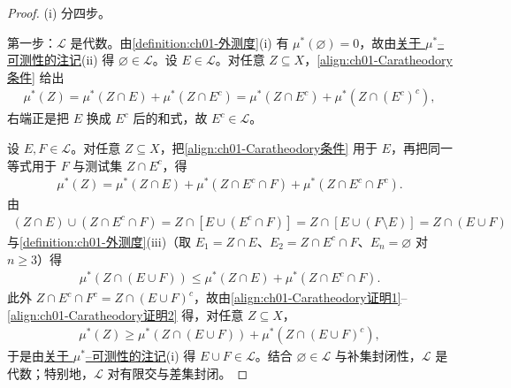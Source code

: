 \documentclass[../../main.tex]{subfiles}%
\begin{document}
\begin{proof}
(i) 分四步。

第一步：$\mathcal{L}$ 是代数。由\cref{definition:ch01-外测度}(i) 有 $\mu^*(\varnothing )=0$，故由\hyperref[remark:ch01-外测度可测]{关于 $\mu^*$--可测性的注记}(ii) 得 $\varnothing\in\mathcal{L}$。设 $E\in\mathcal{L}$。对任意 $Z\subseteq X$，\eqref{align:ch01-Caratheodory条件} 给出
\begin{align*}
\mu^*(Z)=\mu^*(Z\cap E)+\mu^*(Z\cap E^c)=\mu^*(Z\cap E^c)+\mu^*(Z\cap(E^c)^c),
\end{align*}
右端正是把 $E$ 换成 $E^c$ 后的和式，故 $E^c\in\mathcal{L}$。

设 $E,F\in\mathcal{L}$。对任意 $Z\subseteq X$，把\eqref{align:ch01-Caratheodory条件} 用于 $E$，再把同一等式用于 $F$ 与测试集 $Z\cap E^c$，得
\begin{align}
\mu^*(Z)=\mu^*(Z\cap E)+\mu^*(Z\cap E^c\cap F)+\mu^*(Z\cap E^c\cap F^c).\label{align:ch01-Caratheodory证明1}
\end{align}
由
\begin{align*}
(Z\cap E)\cup(Z\cap E^c\cap F)=Z\cap[E\cup(E^c\cap F)]=Z\cap[E\cup(F\setminus E)]=Z\cap(E\cup F)
\end{align*}
与\cref{definition:ch01-外测度}(iii)（取 $E_1=Z\cap E$、$E_2=Z\cap E^c\cap F$、$E_n=\varnothing $ 对 $n\geqslant 3$）得
\begin{align}
\mu^*(Z\cap(E\cup F))\leqslant\mu^*(Z\cap E)+\mu^*(Z\cap E^c\cap F).\label{align:ch01-Caratheodory证明2}
\end{align}
此外 $Z\cap E^c\cap F^c=Z\cap(E\cup F)^c$，故由\eqref{align:ch01-Caratheodory证明1}--\eqref{align:ch01-Caratheodory证明2} 得，对任意 $Z\subseteq X$，
\begin{align*}
\mu^*(Z)\geqslant\mu^*(Z\cap(E\cup F))+\mu^*(Z\cap(E\cup F)^c),
\end{align*}
于是由\hyperref[remark:ch01-外测度可测]{关于 $\mu^*$--可测性的注记}(i) 得 $E\cup F\in\mathcal{L}$。结合 $\varnothing\in\mathcal{L}$ 与补集封闭性，$\mathcal{L}$ 是代数；特别地，$\mathcal{L}$ 对有限交与差集封闭。


\end{proof}
\end{document}
